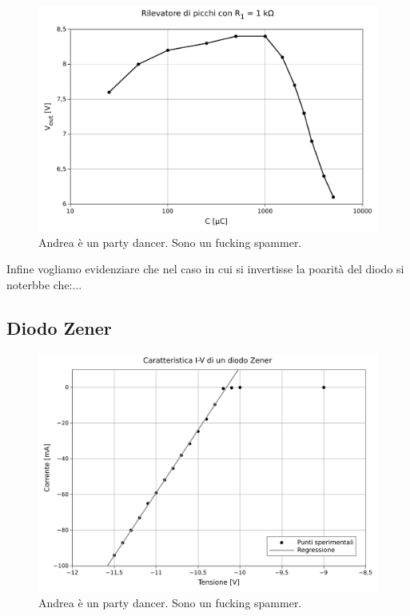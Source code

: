 \begin{figure}
    \includegraphics[scale=0.7]{resistenza.pdf}
    \caption{Andrea è un party dancer. Sono un fucking spammer.}
    \label{fig:resistenza}
\end{figure}

Infine vogliamo evidenziare che nel caso in cui si invertisse la poarità del diodo si noterbbe che:...

\subsection{Diodo Zener}

\begin{figure}
    \includegraphics[scale=0.7]{cara_zener.pdf}
    \caption{Andrea è un party dancer. Sono un fucking spammer.}
    \label{fig:resistenza}
\end{figure}

